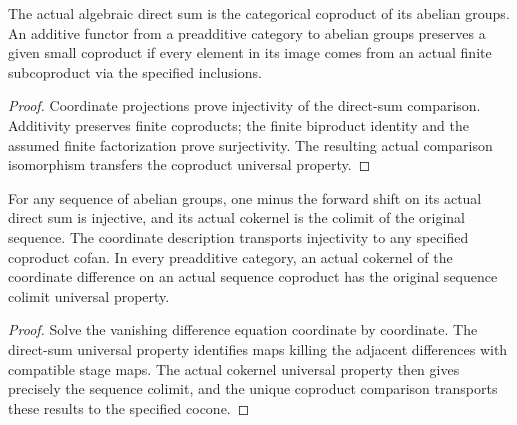 \begin{proposition}
  \label{prop:additive-coproduct-finite-support-criterion}
  \leanok
  The actual algebraic direct sum is the categorical coproduct of its abelian groups. An additive functor from a preadditive category to abelian groups preserves a given small coproduct if every element in its image comes from an actual finite subcoproduct via the specified inclusions.
\end{proposition}
\begin{proof}
  Coordinate projections prove injectivity of the direct-sum comparison. Additivity preserves finite coproducts; the finite biproduct identity and the assumed finite factorization prove surjectivity. The resulting actual comparison isomorphism transfers the coproduct universal property.
  \leanok
\end{proof}

\begin{proposition}
  \label{prop:actual-direct-sequence-difference-colimit}
  \leanok
  For any sequence of abelian groups, one minus the forward shift on its actual direct sum is injective, and its actual cokernel is the colimit of the original sequence. The coordinate description transports injectivity to any specified coproduct cofan. In every preadditive category, an actual cokernel of the coordinate difference on an actual sequence coproduct has the original sequence colimit universal property.
\end{proposition}
\begin{proof}
  Solve the vanishing difference equation coordinate by coordinate. The direct-sum universal property identifies maps killing the adjacent differences with compatible stage maps. The actual cokernel universal property then gives precisely the sequence colimit, and the unique coproduct comparison transports these results to the specified cocone.
  \leanok
\end{proof}

